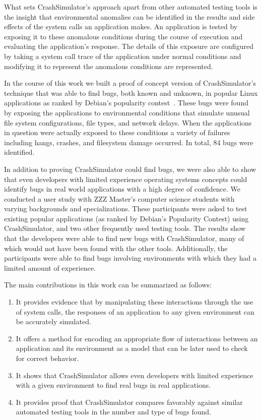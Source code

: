 What sets CrashSimulator's approach apart from other automated testing
tools is the insight that environmental anomalies can be identified
in the results and side effects of the system calls an application makes.
An application is tested by exposing it to these anomalous
conditions during the course of execution and evaluating the application's
response.  The details of this exposure are configured by taking a
system call trace of the application under normal conditions and modifying
it to represent the anomalous conditions are represented.

In the course of this work we built a proof of concept version of
CrashSimulator's technique that was able to find bugs, both known and
unknown, in popular Linux applications as ranked by Debian's popularity
contest~\cite{DebPopCon}.  These bugs were found by exposing the
applications to environmental conditions that simulate unusual file system
configurations, file types, and network delays.  When the applications in
question were actually exposed to these conditions a variety of failures
including hangs, crashes, and filesystem damage occurred.  In total, 84
bugs were identified.

In addition to proving CrashSimulator could find bugs, we were also able to
show that even developers with limited experience operating systems
concepts could identify bugs in real world applications with a high degree
of confidence.
We conducted a user study with
ZZZ Master's computer
science students with varying backgrounds and specializations.  These
participants were asked to test existing popular applications (as ranked by
Debian's Popularity Contest) using CrashSimulator, and two other frequently
used testing tools.
The results show that the developers were able to find new bugs with
CrashSimulator, many of which would not have been found with the other
tools.  Additionally, the
participants were able to find bugs
involving environments with which they had a limited amount of experience.

The main contributions in this work can be summarized as follows:

\begin{enumerate}

\item{It provides evidence that by manipulating these interactions through
the use of system calls, the responses of an application to any given
environment can be accurately simulated.}

\item{It offers a method for encoding an appropriate flow of
interactions between an application and its environment as a model that
can be later used to check for correct behavior.}

\item{It shows that CrashSimulator allows even developers with limited
experience with a given environment to find real bugs in
real applications.}

\item{It provides proof that CrashSimulator compares favorably against
similar automated testing tools in the number and type of bugs found.}

\end{enumerate}
